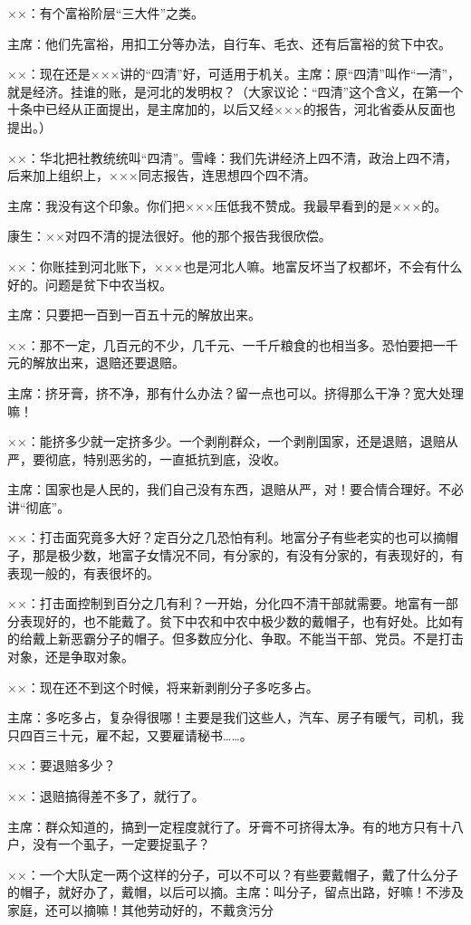 ××：有个富裕阶层“三大件”之类。

主席：他们先富裕，用扣工分等办法，自行车、毛衣、还有后富裕的贫下中农。

××：现在还是×××讲的“四清”好，可适用于机关。主席：原“四清”叫作“一清”，就是经济。挂谁的账，是河北的发明权？（大家议论：“四清”这个含义，在第一个十条中已经从正面提出，是主席加的，以后又经×××的报告，河北省委从反面也提出。）

××：华北把社教统统叫“四清”。雪峰：我们先讲经济上四不清，政治上四不清，后来加上组织上，×××同志报告，连思想四个四不清。

主席：我没有这个印象。你们把×××压低我不赞成。我最早看到的是×××的。

康生：××对四不清的提法很好。他的那个报告我很欣偿。

××：你账挂到河北账下，×××也是河北人嘛。地富反坏当了权都坏，不会有什么好的。问题是贫下中农当权。

主席：只要把一百到一百五十元的解放出来。

××：那不一定，几百元的不少，几千元、一千斤粮食的也相当多。恐怕要把一千元的解放出来，退赔还要退赔。

主席：挤牙膏，挤不净，那有什么办法？留一点也可以。挤得那么干净？宽大处理嘛！

××：能挤多少就一定挤多少。一个剥削群众，一个剥削国家，还是退赔，退赔从严，要彻底，特别恶劣的，一直抵抗到底，没收。

主席：国家也是人民的，我们自己没有东西，退赔从严，对！要合情合理好。不必讲“彻底”。

××：打击面究竟多大好？定百分之几恐怕有利。地富分子有些老实的也可以摘帽子，那是极少数，地富子女情况不同，有分家的，有没有分家的，有表现好的，有表现一般的，有表很坏的。

××：打击面控制到百分之几有利？一开始，分化四不清干部就需要。地富有一部分表现好的，也不能戴了。贫下中农和中农中极少数的戴帽子，也有好处。比如有的给戴上新恶霸分子的帽子。但多数应分化、争取。不能当干部、党员。不是打击对象，还是争取对象。

××：现在还不到这个时候，将来新剥削分子多吃多占。

主席：多吃多占，复杂得很哪！主要是我们这些人，汽车、房子有暖气，司机，我只四百三十元，雇不起，又要雇请秘书……。

××：要退赔多少？

××：退赔搞得差不多了，就行了。

主席：群众知道的，搞到一定程度就行了。牙膏不可挤得太净。有的地方只有十八户，没有一个虱子，一定要捉虱子？

××：一个大队定一两个这样的分子，可以不可以？有些要戴帽子，戴了什么分子的帽子，就好办了，戴帽，以后可以摘。主席：叫分子，留点出路，好嘛！不涉及家庭，还可以摘嘛！其他劳动好的，不戴贪污分


